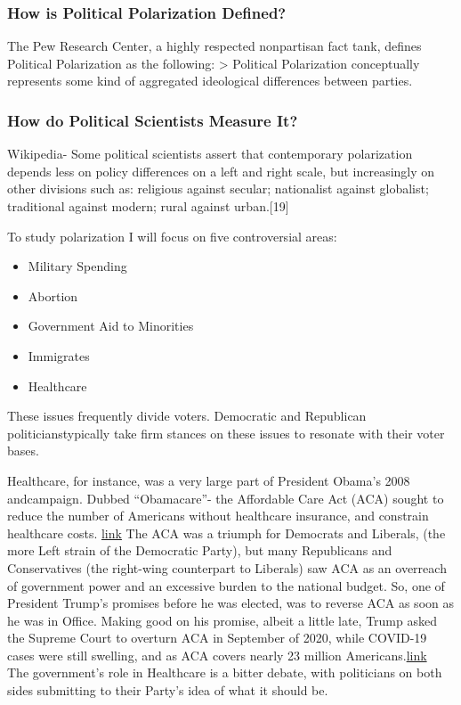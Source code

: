 \documentclass[
]{article}
\providecommand{\tightlist}{%
  \setlength{\itemsep}{0pt}\setlength{\parskip}{0pt}}
\begin{document}
\hypertarget{how-is-political-polarization-defined}{%
\subsubsection{How is Political Polarization
Defined?}\label{how-is-political-polarization-defined}}

The Pew Research Center, a highly respected nonpartisan fact tank,
defines Political Polarization as the following: \textgreater{}
Political Polarization conceptually represents some kind of aggregated
ideological differences between parties.

\hypertarget{how-do-political-scientists-measure-it}{%
\subsubsection{How do Political Scientists Measure
It?}\label{how-do-political-scientists-measure-it}}

Wikipedia- Some political scientists assert that contemporary
polarization depends less on policy differences on a left and right
scale, but increasingly on other divisions such as: religious against
secular; nationalist against globalist; traditional against modern;
rural against urban.{[}19{]}

To study polarization I will focus on five controversial areas:

\begin{itemize}
\tightlist
\item
  Military Spending
\item
  Abortion
\item
  Government Aid to Minorities
\item
  Immigrates
\item
  Healthcare
\end{itemize}

These issues frequently divide voters. Democratic and Republican
politicians\n typically take firm stances on these issues to resonate
with their voter bases.

Healthcare, for instance, was a very large part of President Obama's
2008 and\n  campaign. Dubbed ``Obamacare''- the Affordable Care Act
(ACA) sought to reduce the number of Americans without healthcare
insurance, and constrain healthcare costs.
\href{https://aspe.hhs.gov/pdf-report/health-insurance-coverage-and-affordable-care-act-2010-2016}{link}
The ACA was a triumph for Democrats and Liberals, (the more Left strain
of the Democratic Party), but many Republicans and Conservatives (the
right-wing counterpart to Liberals) saw ACA as an overreach of
government power and an excessive burden to the national budget. So, one
of President Trump's promises before he was elected, was to reverse ACA
as soon as he was in Office. Making good on his promise, albeit a little
late, Trump asked the Supreme Court to overturn ACA in September of
2020, while COVID-19 cases were still swelling, and as ACA covers nearly
23 million
Americans.\href{https://www.nytimes.com/2020/06/26/us/politics/obamacare-trump-administration-supreme-court.html}{link}\\
\n  The government's role in Healthcare is a bitter debate, with
politicians on both sides submitting to their Party's idea of what it
should be.
\end{document}
